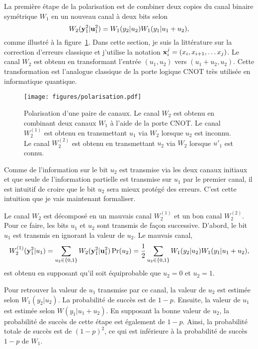 La première étape de la polarisation est de combiner 
deux copies du canal binaire symétrique $W_1$ en un nouveau canal à deux bits selon 
\begin{equation}
  W_2(\vb y_1^2 | \vb u_1^2) = W_1(y_2 | u_2) W_1(y_1 | u_1 + u_2),
\end{equation}
comme illustré à la figure~\ref{fig:polarisation}.
Dans cette section, je suis la littérature sur la correction d'erreurs
classique et j'utilise la notation $\vb x_i^j = (x_i, x_{i + 1}, \ldots x_j)$.
Le canal $W_2$ est obtenu en transformant l'entrée $(u_1, u_2)$ vers $(u_1 + u_2, u_2)$.
Cette transformation est l'analogue classique de la porte logique CNOT très utilisée 
en informatique quantique.

\begin{figure}[t]
  \begin{center}
    \texttt{[image: figures/polarisation.pdf]}
  \end{center}
  \caption[Polarisation des canaux]{
    Polarisation d'une paire de canaux.
    Le canal $W_2$ est obtenu en combinant deux canaux $W_1$ à l'aide de la porte CNOT.
    Le canal $W_2^{(1)}$ est obtenu en transmettant $u_1$ via $W_2$ lorsque $u_2$ est inconnu.
    Le canal $W_2^{(2)}$ est obtenu en transmettant $u_2$ via $W_2$ lorsque $u'_1$ est connu.
  }
  \label{fig:polarisation}
\end{figure}

Comme de l'information sur le bit $u_2$ est transmise via les deux canaux initiaux et 
que seule de l'information partielle est transmise sur $u_1$ par le premier canal,
il est intuitif de croire que le bit $u_2$ sera mieux protégé des erreurs. 
C'est cette intuition que je vais maintenant formaliser.

Le canal $W_2$ est décomposé en un mauvais canal $W_2^{(1)}$ et un bon canal $W_2^{(2)}$.
Pour ce faire,
les bits $u_1$ et $u_2$ sont transmis de façon successive.
D'abord, 
le bit $u_1$ est transmis en ignorant la valeur de $u_2$. 
Le mauvais canal,
\begin{equation}
  W_2^{(1)}(\vb y_1^2 | u_1) 
  = \sum_{u_2 \in \qty{0, 1}} W_2(\vb y_1^2 | \vb u_1^2) \Pr(u_2)
  = \frac{1}{2}\sum_{u_2 \in \qty{0, 1}} W_1(y_2 | u_2) W_1(y_1 | u_1 + u_2),
\end{equation}
est obtenu en supposant qu'il soit équiprobable que $u_2 = 0$ et $u_2 = 1$.

Pour retrouver la valeur de $u_1$ transmise par ce canal, 
la valeur de $u_2$ est estimée selon $W_1(y_2 | u_2)$. 
La probabilité de succès est de $1 - p$. 
Ensuite, 
la valeur de $u_1$ est estimée selon $W(y_1 | u_1 + u_2)$.
En supposant la bonne valeur de $u_2$, 
la probabilité de succès de cette étape est également de $1 - p$.
Ainsi, la probabilité totale de succès est de $(1 - p)^2$,
ce qui est inférieure à la probabilité de succès $1 - p$ de $W_1$.

